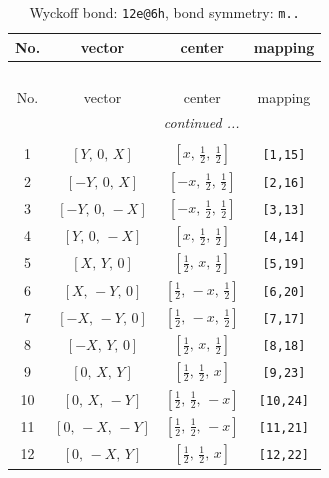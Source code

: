 \documentclass[fleqn,8pt]{jsarticle}
\begin{document}
\renewcommand{\arraystretch}{1.2}
\begin{longtable}{cccc}
\caption{Wyckoff bond: {\tt 12e@6h}, bond symmetry: {\tt m..}}
 \\
 \hline \hline
No. & vector & center & mapping \\ \hline \endfirsthead

\multicolumn{3}{l}{\tablename\ \thetable{}} \\
 \hline \hline
No. & vector & center & mapping \\ \hline \endhead

 \hline \hline
\multicolumn{3}{r}{\footnotesize\it continued ...} \\ \endfoot

 \hline \hline
\multicolumn{3}{r}{} \\ \endlastfoot

1 & $\left[ Y,\, 0,\, X \right]$ & $\left[ x,\, \frac{1}{2},\, \frac{1}{2} \right]$ & {\tt [1,15]} \\ \hline
2 & $\left[ - Y,\, 0,\, X \right]$ & $\left[ - x,\, \frac{1}{2},\, \frac{1}{2} \right]$ & {\tt [2,16]} \\ \hline
3 & $\left[ - Y,\, 0,\, - X \right]$ & $\left[ - x,\, \frac{1}{2},\, \frac{1}{2} \right]$ & {\tt [3,13]} \\ \hline
4 & $\left[ Y,\, 0,\, - X \right]$ & $\left[ x,\, \frac{1}{2},\, \frac{1}{2} \right]$ & {\tt [4,14]} \\ \hline
5 & $\left[ X,\, Y,\, 0 \right]$ & $\left[ \frac{1}{2},\, x,\, \frac{1}{2} \right]$ & {\tt [5,19]} \\ \hline
6 & $\left[ X,\, - Y,\, 0 \right]$ & $\left[ \frac{1}{2},\, - x,\, \frac{1}{2} \right]$ & {\tt [6,20]} \\ \hline
7 & $\left[ - X,\, - Y,\, 0 \right]$ & $\left[ \frac{1}{2},\, - x,\, \frac{1}{2} \right]$ & {\tt [7,17]} \\ \hline
8 & $\left[ - X,\, Y,\, 0 \right]$ & $\left[ \frac{1}{2},\, x,\, \frac{1}{2} \right]$ & {\tt [8,18]} \\ \hline
9 & $\left[ 0,\, X,\, Y \right]$ & $\left[ \frac{1}{2},\, \frac{1}{2},\, x \right]$ & {\tt [9,23]} \\ \hline
10 & $\left[ 0,\, X,\, - Y \right]$ & $\left[ \frac{1}{2},\, \frac{1}{2},\, - x \right]$ & {\tt [10,24]} \\ \hline
11 & $\left[ 0,\, - X,\, - Y \right]$ & $\left[ \frac{1}{2},\, \frac{1}{2},\, - x \right]$ & {\tt [11,21]} \\ \hline
12 & $\left[ 0,\, - X,\, Y \right]$ & $\left[ \frac{1}{2},\, \frac{1}{2},\, x \right]$ & {\tt [12,22]} \\
\end{longtable}
\end{document}
